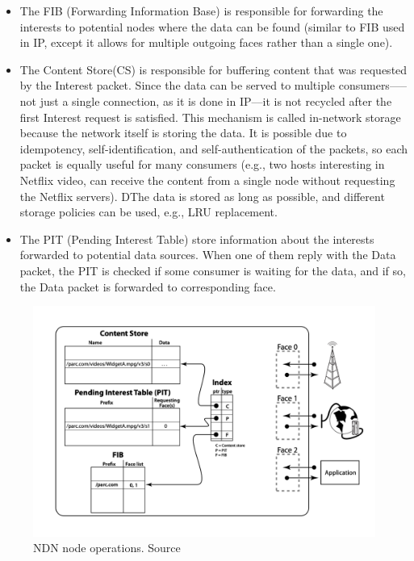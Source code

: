 \begin{itemize}
    \item The FIB (Forwarding Information Base) is responsible for forwarding the interests to potential nodes where the data can be found (similar to FIB used in IP, except it allows for multiple outgoing faces rather than a single one). 

    \item The Content Store(CS) is responsible for buffering content that was requested by the Interest packet. Since the data can be served to multiple consumers–––not just a single connection, as it is done in IP––it is not recycled after the first Interest request is satisfied. This mechanism is called in-network storage because the network itself is storing the data. It is possible due to idempotency, self-identification, and self-authentication of the packets, so each packet is equally useful for many consumers (e.g., two hosts interesting in Netflix video, can receive the content from a single node without requesting the Netflix servers). DThe data is stored as long as possible, and different storage policies can be used, e.g., LRU replacement.

    \item The PIT (Pending Interest Table) store information about the interests forwarded to potential data sources. When one of them reply with the Data packet, the PIT is checked if some consumer is waiting for the data, and if so, the Data packet is forwarded to corresponding face.
\end{itemize}
\begin{figure}[h]
    \centering
    \includegraphics[width=\linewidth]{img/ndn-operations.png}
    \caption{NDN node operations. Source \cite{jacobson2009networking}}
    \label{fig:ndn-operations}
\end{figure}

